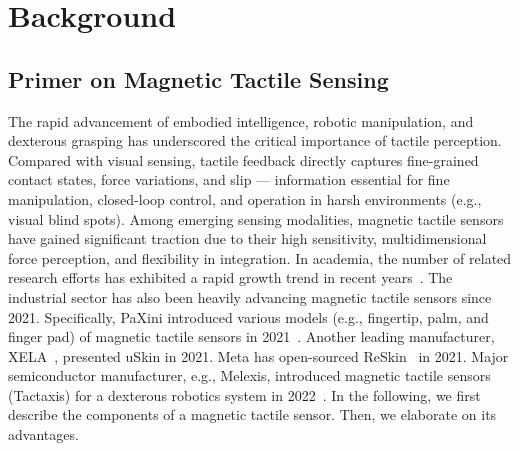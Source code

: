 \section{Background}
\label{sec:background}

\subsection{Primer on Magnetic Tactile Sensing}
The rapid advancement of embodied intelligence, robotic manipulation, and dexterous grasping has underscored the critical importance of tactile perception. 
Compared with visual sensing, tactile feedback directly captures fine-grained contact states, force variations, and slip --- information essential for fine manipulation, closed-loop control, and operation in harsh environments (e.g., visual blind spots). 
Among emerging sensing modalities, magnetic tactile sensors have gained significant traction due to their high sensitivity, multidimensional force perception, and flexibility in integration.
In academia, the number of related research efforts has exhibited a rapid growth trend in recent years~\cite{man2024bionic,bhirangi2025anyskin,pattabiraman2025eflesh,hu2024magneticskin,yan2021softmagnetic}.
The industrial sector has also been heavily advancing magnetic tactile sensors since 2021.
Specifically, PaXini introduced various models (e.g., fingertip, palm, and finger pad) of magnetic tactile sensors in 2021~\cite{paxini2026official}.
Another leading manufacturer, XELA~\cite{xela2026official}, presented uSkin in 2021. 
Meta has open-sourced ReSkin~\cite{bhirangi2021reskin} in 2021.
Major semiconductor manufacturer, e.g., Melexis, introduced magnetic tactile sensors (Tactaxis) for a dexterous robotics system in 2022~\cite{le2022gradiometric}. 
In the following, we first describe the components of a magnetic tactile sensor. Then, we elaborate on its advantages. 

